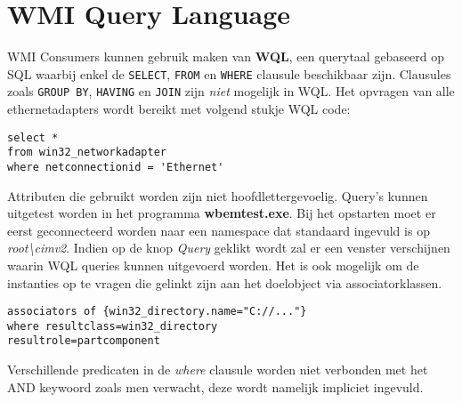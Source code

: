 \documentclass{report}
\begin{document}
	\section{WMI Query Language}
	WMI Consumers kunnen gebruik maken van \textbf{WQL}, een querytaal gebaseerd op SQL waarbij enkel de \texttt{SELECT}, \texttt{FROM} en \texttt{WHERE} clausule beschikbaar zijn. Clausules zoals \texttt{GROUP BY}, \texttt{HAVING} en \texttt{JOIN} zijn \textit{niet} mogelijk in WQL. Het opvragen van alle ethernetadapters wordt bereikt met volgend stukje WQL code:
	\begin{lstlisting}
select * 
from win32_networkadapter
where netconnectionid = 'Ethernet'
	\end{lstlisting}
	Attributen die gebruikt worden zijn niet hoofdlettergevoelig. Query's kunnen uitgetest worden in het programma \textbf{wbemtest.exe}. Bij het opstarten moet er eerst geconnecteerd worden naar een namespace dat standaard ingevuld is op \textit{root\textbackslash cimv2}. Indien op de knop \textit{Query} geklikt wordt zal er een venster verschijnen waarin WQL queries kunnen uitgevoerd worden. Het is ook mogelijk om de instanties op te vragen die gelinkt zijn aan het doelobject via associatorklassen.
	
	
	\begin{lstlisting}
associators of {win32_directory.name="C://..."}
where resultclass=win32_directory
resultrole=partcomponent
	\end{lstlisting}
	Verschillende predicaten in de \textit{where} clausule worden niet verbonden met het AND keywoord zoals men verwacht, deze wordt namelijk impliciet ingevuld.
\end{document}
